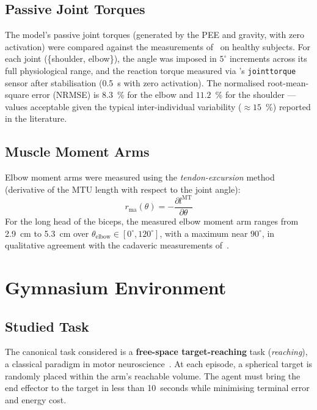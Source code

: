 \subsection{Passive Joint Torques}

The model's passive joint torques (generated by the PEE and gravity, with zero
activation) were compared against the measurements of~\parencite{Holzbaur2005}
on healthy subjects. For each joint (\{shoulder, elbow\}), the angle was imposed
in $5^\circ$ increments across its full physiological range, and the reaction
torque measured via \MuJoCo{}'s \texttt{jointtorque} sensor after stabilisation
(\SI{0.5}{\second} with zero activation). The normalised root-mean-square error
(NRMSE) is $8.3$~\% for the elbow and $11.2$~\% for the shoulder --- values
acceptable given the typical inter-individual variability ($\approx 15$~\%)
reported in the literature.

\subsection{Muscle Moment Arms}

Elbow moment arms were measured using the \textit{tendon-excursion} method
(derivative of the MTU length with respect to the joint angle):
\begin{equation}
  r_\text{ma}(\theta) = -\frac{\partial l^\text{MT}}{\partial \theta}
  \label{eq:moment_arm}
\end{equation}
For the long head of the biceps, the measured elbow moment arm ranges from
\SI{2.9}{\centi\meter} to \SI{5.3}{\centi\meter} over
$\theta_\text{elbow} \in [0^\circ, 120^\circ]$, with a maximum near $90^\circ$,
in qualitative agreement with the cadaveric measurements of~\parencite{Murray1995}.

\section{Gymnasium Environment}

\subsection{Studied Task}

The canonical task considered is a \textbf{free-space target-reaching}
task (\textit{reaching}), a classical paradigm in motor
neuroscience~\parencite{Shadmehr2008}. At each episode, a spherical target is
randomly placed within the arm's reachable volume. The agent must bring the end
effector to the target in less than 10~seconds while minimising terminal error and
energy cost.

